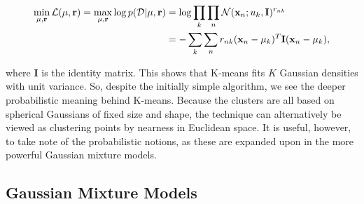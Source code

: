 \documentclass[11pt]{amsart}
\begin{document}
\begin{align}\min_{\mu, \mathbf{r}} \mathcal{L}(\mu, \mathbf{r}) = \max_{\mu, \mathbf{r}} \log p(\mathcal{D} | \mu, \mathbf{r}) &= \log\prod_k\prod_n \mathcal{N}(\mathbf{x}_n ; u_k, \mathbf{I})^{r_{nk}} \notag \\
&= -\sum_k\sum_nr_{nk}(\mathbf{x}_n - \mu_k)^T\mathbf{I}(\mathbf{x}_n - \mu_k), \notag
\end{align}

where $\mathbf{I}$ is the identity matrix. This shows that K-means fits $K$ Gaussian densities with unit variance. So, despite the initially simple algorithm, we see the deeper probabilistic meaning behind K-means. Because the clusters are all based on spherical Gaussians of fixed size and shape, the technique can alternatively be viewed as clustering points by nearness in Euclidean space. It is useful, however, to take note of the probabilistic notions, as these are expanded upon in the more powerful Gaussian mixture models.

\subsection{Gaussian Mixture Models}
\end{document}

